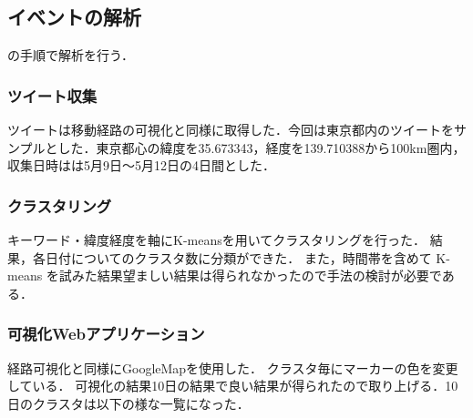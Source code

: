 \subsection{イベントの解析}
の手順で解析を行う．



\subsubsection{ツイート収集}
ツイートは移動経路の可視化と同様に取得した．今回は東京都内のツイートをサンプルとした．東京都心の緯度を35.673343，経度を139.710388から100km圏内，収集日時はは5月9日〜5月12日の4日間とした．

\subsubsection{クラスタリング}
キーワード・緯度経度を軸にK-meansを用いてクラスタリングを行った．
結果，各日付についてのクラスタ数に分類ができた．
また，時間帯を含めて K-means を試みた結果望ましい結果は得られなかったので手法の検討が必要である．





\subsubsection{可視化Webアプリケーション}
経路可視化と同様にGoogleMapを使用した． クラスタ毎にマーカーの色を変更している．
可視化の結果10日の結果で良い結果が得られたので取り上げる．10日のクラスタは以下の様な一覧になった．




